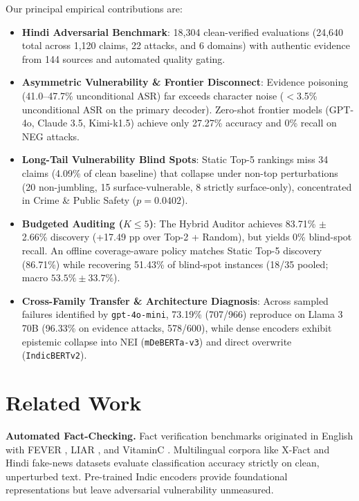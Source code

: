 \documentclass[11pt]{article}
\begin{document}
Our principal empirical contributions are:
\begin{itemize}[leftmargin=1.1em,itemsep=0pt,topsep=1pt]
\item \textbf{Hindi Adversarial Benchmark}: 18,304 clean-verified evaluations (24,640 total across 1,120 claims, 22 attacks, and 6 domains) with authentic evidence from 144 sources and automated quality gating.
\item \textbf{Asymmetric Vulnerability \& Frontier Disconnect}: Evidence poisoning (41.0--47.7\% unconditional ASR) far exceeds character noise ($<$3.5\% unconditional ASR on the primary decoder). Zero-shot frontier models (GPT-4o, Claude 3.5, Kimi-k1.5) achieve only 27.27\% accuracy and 0\% recall on NEG attacks.
\item \textbf{Long-Tail Vulnerability Blind Spots}: Static Top-5 rankings miss 34 claims (4.09\% of clean baseline) that collapse under non-top perturbations (20 non-jumbling, 15 surface-vulnerable, 8 strictly surface-only), concentrated in Crime \& Public Safety ($p = 0.0402$).
\item \textbf{Budgeted Auditing ($K \le 5$)}: The Hybrid Auditor achieves 83.71\% $\pm$ 2.66\% discovery (+17.49 pp over Top-2 + Random), but yields 0\% blind-spot recall. An offline coverage-aware policy matches Static Top-5 discovery (86.71\%) while recovering 51.43\% of blind-spot instances (18/35 pooled; macro $53.5\% \pm 33.7\%$).
\item \textbf{Cross-Family Transfer \& Architecture Diagnosis}: Across sampled failures identified by \texttt{gpt-4o-mini}, 73.19\% (707/966) reproduce on Llama 3 70B (96.33\% on evidence attacks, 578/600), while dense encoders exhibit epistemic collapse into NEI (\texttt{mDeBERTa-v3}) and direct overwrite (\texttt{IndicBERTv2}).
\end{itemize}

\section{Related Work}
\label{sec:related}

\textbf{Automated Fact-Checking.} Fact verification benchmarks originated in English with FEVER \citep{thorne2018fever}, LIAR \citep{wang2017liar}, and VitaminC \citep{schuster2021vitaminc}. Multilingual corpora like X-Fact \citep{gupta2021xfact} and Hindi fake-news datasets \citep{kumar2022hindi} evaluate classification accuracy strictly on clean, unperturbed text. Pre-trained Indic encoders \citep{kakwani2020indicnlpsuite,doddapaneni2023indic} provide foundational representations but leave adversarial vulnerability unmeasured.
\end{document}

